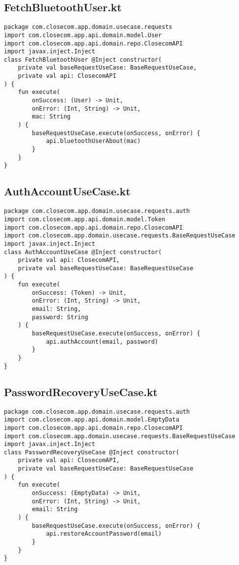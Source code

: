 \documentclass[listing]{espd}
\begin{document}
\subsection{FetchBluetoothUser.kt}
\begin{verbatim}
package com.closecom.app.domain.usecase.requests
import com.closecom.app.api.domain.model.User
import com.closecom.app.api.domain.repo.ClosecomAPI
import javax.inject.Inject
class FetchBluetoothUser @Inject constructor(
    private val baseRequestUseCase: BaseRequestUseCase,
    private val api: ClosecomAPI
) {
    fun execute(
        onSuccess: (User) -> Unit,
        onError: (Int, String) -> Unit,
        mac: String
    ) {
        baseRequestUseCase.execute(onSuccess, onError) {
            api.bluetoothUserAbout(mac)
        }
    }
}
\end{verbatim}

\subsection{AuthAccountUseCase.kt}
\begin{verbatim}
package com.closecom.app.domain.usecase.requests.auth
import com.closecom.app.api.domain.model.Token
import com.closecom.app.api.domain.repo.ClosecomAPI
import com.closecom.app.domain.usecase.requests.BaseRequestUseCase
import javax.inject.Inject
class AuthAccountUseCase @Inject constructor(
    private val api: ClosecomAPI,
    private val baseRequestUseCase: BaseRequestUseCase
) {
    fun execute(
        onSuccess: (Token) -> Unit,
        onError: (Int, String) -> Unit,
        email: String,
        password: String
    ) {
        baseRequestUseCase.execute(onSuccess, onError) {
            api.authAccount(email, password)
        }
    }
}
\end{verbatim}

\subsection{PasswordRecoveryUseCase.kt}
\begin{verbatim}
package com.closecom.app.domain.usecase.requests.auth
import com.closecom.app.api.domain.model.EmptyData
import com.closecom.app.api.domain.repo.ClosecomAPI
import com.closecom.app.domain.usecase.requests.BaseRequestUseCase
import javax.inject.Inject
class PasswordRecoveryUseCase @Inject constructor(
    private val api: ClosecomAPI,
    private val baseRequestUseCase: BaseRequestUseCase
) {
    fun execute(
        onSuccess: (EmptyData) -> Unit,
        onError: (Int, String) -> Unit,
        email: String
    ) {
        baseRequestUseCase.execute(onSuccess, onError) {
            api.restoreAccountPassword(email)
        }
    }
}
\end{verbatim}
\end{document}
